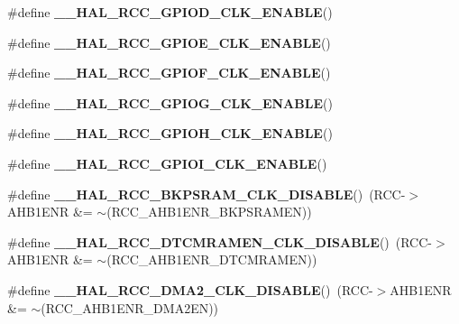 \begin{DoxyCompactItemize}
\#define {\bfseries \+\_\+\+\_\+\+H\+A\+L\+\_\+\+R\+C\+C\+\_\+\+G\+P\+I\+O\+D\+\_\+\+C\+L\+K\+\_\+\+E\+N\+A\+B\+LE}()
\item 
\#define {\bfseries \+\_\+\+\_\+\+H\+A\+L\+\_\+\+R\+C\+C\+\_\+\+G\+P\+I\+O\+E\+\_\+\+C\+L\+K\+\_\+\+E\+N\+A\+B\+LE}()
\item 
\#define {\bfseries \+\_\+\+\_\+\+H\+A\+L\+\_\+\+R\+C\+C\+\_\+\+G\+P\+I\+O\+F\+\_\+\+C\+L\+K\+\_\+\+E\+N\+A\+B\+LE}()
\item 
\#define {\bfseries \+\_\+\+\_\+\+H\+A\+L\+\_\+\+R\+C\+C\+\_\+\+G\+P\+I\+O\+G\+\_\+\+C\+L\+K\+\_\+\+E\+N\+A\+B\+LE}()
\item 
\#define {\bfseries \+\_\+\+\_\+\+H\+A\+L\+\_\+\+R\+C\+C\+\_\+\+G\+P\+I\+O\+H\+\_\+\+C\+L\+K\+\_\+\+E\+N\+A\+B\+LE}()
\item 
\#define {\bfseries \+\_\+\+\_\+\+H\+A\+L\+\_\+\+R\+C\+C\+\_\+\+G\+P\+I\+O\+I\+\_\+\+C\+L\+K\+\_\+\+E\+N\+A\+B\+LE}()
\item 
\mbox{\label{group___r_c_c_ex___peripheral___clock___enable___disable_ga99d6bde82e92bd4b7f45fde7fd0a6760}} 
\#define {\bfseries \+\_\+\+\_\+\+H\+A\+L\+\_\+\+R\+C\+C\+\_\+\+B\+K\+P\+S\+R\+A\+M\+\_\+\+C\+L\+K\+\_\+\+D\+I\+S\+A\+B\+LE}()~(R\+CC-\/$>$A\+H\+B1\+E\+NR \&= $\sim$(R\+C\+C\+\_\+\+A\+H\+B1\+E\+N\+R\+\_\+\+B\+K\+P\+S\+R\+A\+M\+EN))
\item 
\mbox{\label{group___r_c_c_ex___peripheral___clock___enable___disable_ga513814e098695e070035414285a0eb39}} 
\#define {\bfseries \+\_\+\+\_\+\+H\+A\+L\+\_\+\+R\+C\+C\+\_\+\+D\+T\+C\+M\+R\+A\+M\+E\+N\+\_\+\+C\+L\+K\+\_\+\+D\+I\+S\+A\+B\+LE}()~(R\+CC-\/$>$A\+H\+B1\+E\+NR \&= $\sim$(R\+C\+C\+\_\+\+A\+H\+B1\+E\+N\+R\+\_\+\+D\+T\+C\+M\+R\+A\+M\+EN))
\item 
\mbox{\label{group___r_c_c_ex___peripheral___clock___enable___disable_gaa97383d7ee14e9a638eb8c9ba35658f0}} 
\#define {\bfseries \+\_\+\+\_\+\+H\+A\+L\+\_\+\+R\+C\+C\+\_\+\+D\+M\+A2\+\_\+\+C\+L\+K\+\_\+\+D\+I\+S\+A\+B\+LE}()~(R\+CC-\/$>$A\+H\+B1\+E\+NR \&= $\sim$(R\+C\+C\+\_\+\+A\+H\+B1\+E\+N\+R\+\_\+\+D\+M\+A2\+EN))
\item 
\mbox{\label{group___r_c_c_ex___peripheral___clock___enable___disable_ga222a9bad41499b041c5dbd0e64e78a2d}} 

\end{DoxyCompactItemize}
